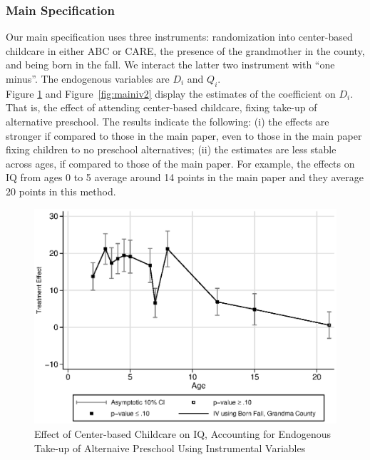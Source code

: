 \begin{appendices}
\subsubsection{Main Specification}

\noindent Our main specification uses three instruments: randomization into center-based childcare in either ABC or CARE, the presence of the grandmother in the county, and being born in the fall. We interact the latter two instrument with ``one minus''. The endogenous variables are $D_{i}$ and $Q_{i}$.\\

\noindent Figure \ref{fig:main_iv1} and Figure~\ref{fig:mainiv2} display the estimates of the coefficient on $D_{i}$. That is, the effect of attending center-based childcare, fixing take-up of alternative preschool. The results indicate the following: (i) the effects are stronger if compared to those in the main paper, even to those in the main paper fixing children to no preschool alternatives; (ii) the estimates are less stable across ages, if compared to those of the main paper. For example, the effects on IQ from ages 0 to 5 average around 14 points in the main paper and they average 20 points in this method. 

\begin{figure}[H]
		\caption{Effect of Center-based Childcare on IQ, Accounting for Endogenous Take-up of Alternaive Preschool Using Instrumental Variables} \label{fig:main_iv1}
		\includegraphics[width=.5\columnwidth]{output/appendixplots/main_iv_te.eps}
\end{figure}


\end{appendices}
